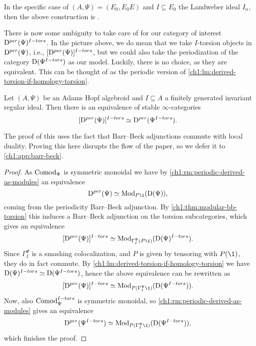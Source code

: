 \begin{remark}
    In the specific case of $(A, \Psi) = (E_0, E_0E)$ and $I\subseteq E_0$ the Landweber ideal $I_n$, then the above construction is \cite[3.12]{barthel-schlank-stapleton_2021}. 
\end{remark}

There is now some ambiguity to take care of for our category of interest $\mathrm{D}^{per}(\Psi)^{I-tors}$. In the picture above, we do mean that we take $I$-torsion objects in $\mathrm{D}^{per}(\Psi)$, i.e., $[\mathrm{D}^{per}(\Psi)]^{I-tors}$, but we could also take the periodization of the category $\mathrm{D}(\Psi^{I-tors})$ as our model. Luckily, there is no choice, as they are equivalent. This can be thought of as the periodic version of \cref{ch1:lm:derived-torsion-if-homology-torsion}.

\begin{theorem}
    \label{ch1:thm:pulling-out-torsion}
    Let $(A, \Psi)$ be an Adams Hopf algebroid and $I\subseteq A$ a finitely generated invariant regular ideal. Then there is an equivalence of stable $\infty$-categories 
    $$[\mathrm{D}^{per}(\Psi)]^{I-tors}\simeq \mathrm{D}^{per}(\Psi^{I-tors}).$$
\end{theorem}

The proof of this uses the fact that Barr--Beck adjunctions commute with local duality. Proving this here disrupts the flow of the paper, so we defer it to \cref{ch1:app:barr-beck}. 

\begin{proof}
    As $\mathrm{Comod}_\Psi$ is symmetric monoidal we have by \cref{ch1:rm:periodic-derived-as-modules} an equivalence
    \[\Dper(\Psi)\simeq \Mod_{P\1}(\Der(\Psi)),\]
    coming from the periodicity Barr--Beck adjunction.
    By \cref{ch1:thm:modular-bb-torsion} this induces a Barr--Beck adjunction on the torsion subcategories, which gives an equivalence 
    $$[\Dper(\Psi)]^{I-tors}\simeq \Mod_{\Gamma_I^\Psi (P\1)}(\Der(\Psi)^{I-tors}).$$
    Since $\Gamma_I^\Psi$ is a smashing colocalization, and $P$ is given by tensoring with $P(\1)$, they do in fact commute. By \cref{ch1:lm:derived-torsion-if-homology-torsion} we have $\mathrm{D}(\Psi)^{I-tors}\simeq \mathrm{D}(\Psi^{I-tors})$, hence the above equivalence can be rewritten as
    $$[\Dper(\Psi)]^{I-tors}\simeq \Mod_{P(\Gamma_I^\Psi \1)}(\Der(\Psi^{I-tors})).$$
    Now, also $\mathrm{Comod}_\Psi^{I-tors}$ is symmetric monoidal, so \cref{ch1:rm:periodic-derived-as-modules} gives an equivalence 
    \[\Dper(\Psi^{I-tors})\simeq \Mod_{P(\Gamma_I^\Psi\1)}(\Der(\Psi^{I-tors})),\]which finishes the proof.
\end{proof}

